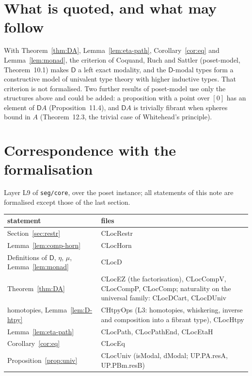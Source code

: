 \documentclass[11pt]{article}
\newcommand{\D}{\mathsf{D}}
\theoremstyle{plain}
\theoremstyle{definition}
\theoremstyle{remark}
\begin{document}
\section{What is quoted, and what may follow}

With Theorem~\ref{thm:DA}, Lemma~\ref{lem:eta-path}, Corollary~\ref{cor:eq}
and Lemma~\ref{lem:monad}, the criterion of Coquand, Ruch and Sattler
(poset-model, Theorem~10.1) makes $\D$ a left exact modality, and the
$\D$-modal types form a constructive model of univalent type theory with
higher inductive types. That criterion is not formalised. Two further results
of poset-model use only the structures above and could be added: a
proposition with a point over $[0]$ has an element of $\D A$
(Proposition~11.4), and $\D A$ is trivially fibrant when spheres bound in $A$
(Theorem~12.3, the trivial case of Whitehead's principle).

\appendix
\section{Correspondence with the formalisation}

\noindent Layer L9 of \texttt{seg/core}, over the poset instance; all
statements of this note are formalised except those of the last section.

\medskip
\begin{tabular}{p{4.3cm}p{9.6cm}}
statement & files\\\hline
Section~\ref{sec:restr} & CLocRestr\\
Lemma~\ref{lem:comp-horn} & CLocHorn\\
Definitions of $\D$, $\eta$, $\mu$, Lemma~\ref{lem:monad} & CLocD\\
Theorem~\ref{thm:DA} & CLocEZ (the factorisation), CLocCompV, CLocCompP, CLocComp; naturality on the universal family: CLocDCart, CLocDUniv\\
homotopies, Lemma~\ref{lem:D-htpy} & CHtpyOps (L3: homotopies, whiskering, inverse and composition into a fibrant type), CLocHtpy\\
Lemma~\ref{lem:eta-path} & CLocPath, CLocPathEnd, CLocEtaH\\
Corollary~\ref{cor:eq} & CLocEq\\
Proposition~\ref{prop:univ} & CLocUniv (isModal, dModal; UP.PA.resA, UP.PBm.resB)
\end{tabular}
\end{document}

